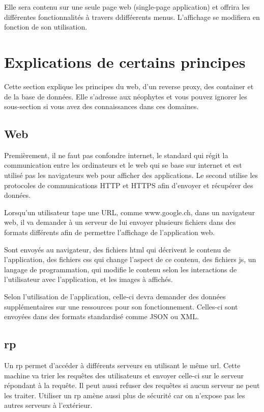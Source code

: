 \documentclass[
    iai, %
    il, %
]{heig-tb}
\begin{document}
Elle sera contenu sur une seule page web (single-page application)
et offrira les différentes fonctionnalités à travers ddifféerents menus.
L'affichage se modifiera en fonction de son utilisation.

\section{Explications de certains principes}
Cette section explique les principes du web, d'un reverse proxy, des container et de la base de données.
Elle s'adresse aux néophytes et vous pouvez ignorer les sous-section si vous avez des connaissances dans ces domaines.

\subsection{Web}
Premièrement, il ne faut pas confondre internet, le standard qui régit la communication entre les ordinateurs
et le web qui se base sur internet et est utilisé pas les navigateurs web pour afficher des applications.
Le second utilise les protocoles de communications HTTP et HTTPS afin d'envoyer et récupérer des données.

Lorsqu'un utilisateur tape une URL, comme www.google.ch, dans un navigateur web, il va demander à un serveur de lui envoyer
plusieurs fichiers dans des formats différents afin de permettre l'affichage de l'application web.

Sont envoyés au navigateur, des fichiers \gls{html} qui décrivent le contenu de l'application, des fichiers \gls{css} qui change l'aspect de ce contenu,
des fichiers \gls{js}, un langage de programmation, qui modifie le contenu selon les interactions de l'utilisateur avec l'application, et
les images à affichés.

Selon l'utilisation de l'application, celle-ci devra demander des données supplémentaires sur une ressources pour son fonctionnement.
Celles-ci sont envoyées dans des formats standardisé comme JSON ou XML.

\subsection{\Gls{rp}}
Un \gls{rp} permet d'accéder à différents serveurs en utilisant le même url.
Cette machine va trier les requêtes des utilisateurs
et envoyer celle-ci sur le serveur répondant à la requête.
Il peut aussi refuser des requêtes si aucun serveur ne peut les traiter.
Utiliser un \gls{rp} amène aussi plus de sécurité car on n'expose pas les autres serveurs à l'extérieur.
\end{document}
